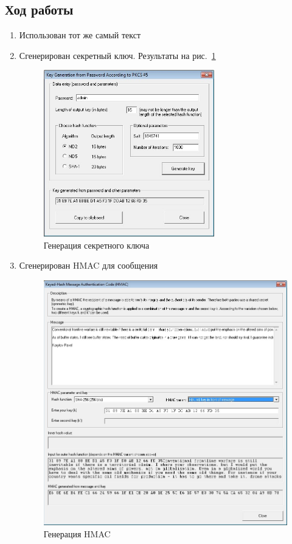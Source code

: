 \documentclass[a4paper, 14pt]{extarticle}
\begin{document}
\subsection{Ход работы}
\begin{enumerate}
    \item Использован тот же самый текст
    \item Сгенерирован секретный ключ. Результаты на рис.~\ref{img:s3:1}
    \begin{figure}[h]
        \centering
        \includegraphics[width=0.7\textwidth]{img/S015.jpg}
        \caption{Генерация секретного ключа}%
        \label{img:s3:1}
    \end{figure}
    
    \FloatBarrier{}
    \item Сгенерирован HMAC для сообщения
    \begin{figure}[h]
        \centering
        \includegraphics[width=\textwidth]{img/HMAC.jpg}
        \caption{Генерация HMAC}%
    \end{figure}
    
\end{enumerate}
\end{document}
